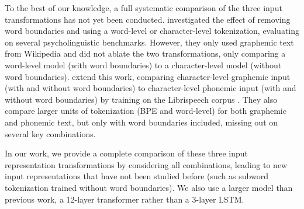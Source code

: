To the best of our knowledge, a full systematic comparison of the three input transformations has not yet been conducted.  \citet{hahn-baroni-2019-tabula} investigated the effect of removing word boundaries and using a word-level or character-level tokenization, evaluating on several psycholinguistic benchmarks. However, they only used graphemic text from Wikipedia and did not ablate the two transformations, only comparing a word-level model (with word boundaries) to a character-level model (without word boundaries). \citet{nguyen-2022-word-boundaries} extend this work, comparing character-level graphemic input (with and without word boundaries) to character-level phonemic input (with and without word boundaries) by training on the Librispeech corpus \citep{panayotov2015librispeech}. They also compare larger units of tokenization (BPE and word-level) for both graphemic and phonemic text, but only with word boundaries included, missing out on several key combinations. 

In our work, we provide a complete comparison of these three input representation transformations by considering all combinations, leading to new input representations that have not been studied before (such as subword tokenization trained without word boundaries). We also use a larger model than previous work, a 12-layer transformer rather than a 3-layer LSTM.



